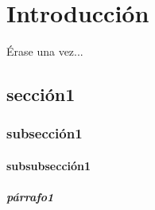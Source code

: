 
\chapter{Introducción} \label{cap.introduccion}
Érase una vez... \cite{Nobody06}
\section{sección1}
\blindtext[3]
\subsection{subsección1}
\blindtext[3]
\subsubsection{subsubsección1}
\blindtext[10]
\paragraph{párrafo1}
\blindtext[3]
